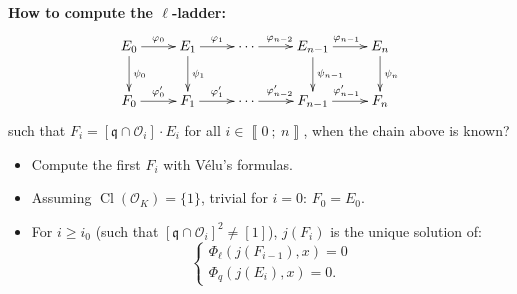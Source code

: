 \documentclass[10pt]{beamer}
\theoremstyle{plain}
\theoremstyle{definition}
\newcommand{\mO}{\mathcal{O}}
\renewcommand{\i}[2]{\left\llbracket #1~;~#2\right\rrbracket}
\renewcommand{\(}{\left(}
\renewcommand{\)}{\right)}
\newcommand{\mf}[1]{\mathfrak{#1}}
\newcommand{\mfq}{\mathfrak{q}}
\DeclareMathOperator{\Cl}{Cl}
\begin{document}
\begin{frame}
\textbf{How to compute the $\ell$-ladder:}
\[\xymatrix{
E_0 \ar[d]^{\psi_0} \ar[r]^{\varphi_0} & E_1\ar[d]^{\psi_1} \ar[r]^{\varphi_{1}}& \cdots \ar[r]^{\varphi_{n-2}} & E_{n-1} \ar[d]^{\psi_{n-1}} \ar[r]^{\varphi_{n-1}} & E_n \ar[d]^{\psi_n}\\
F_0 \ar[r]^{\varphi'_0} & F_1 \ar[r]^{\varphi'_{1}}& \cdots \ar[r]^{\varphi'_{n-2}} & F_{n-1} \ar[r]^{\varphi'_{n-1}} & F_n
}\]
such that $F_i=[\mf{q}\cap\mO_i]\cdot E_i$ for all $i\in\i{0}{n}$, when the chain above is known?

\vspace{0.5cm}

\pause

\begin{itemize}
\item Compute the first $F_i$ with V\'{e}lu's formulas.
\item Assuming $\Cl(\mO_K)=\{1\}$, trivial for $i=0$: $F_0=E_0$.
\item For $i\geq i_0$ (such that $[\mfq\cap\mO_i]^2\neq [1]$), $j(F_{i})$ is the unique solution of:
\[\left\{\begin{array}{c}
\Phi_\ell(j(F_{i-1}),x)=0\\
\Phi_q(j(E_{i}),x)=0.
\end{array}\right. \]
\end{itemize}

\end{frame}
\end{document}
